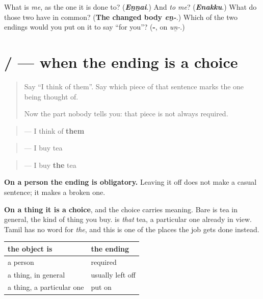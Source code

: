 \begin{tcolorbox}[breakable,colback=teal!4,colframe=teal!35!black,title={Before you move on}]
What is \emph{me}, as the one it is done to? (\emph{\textbf{Eṉṉai}}.) And \emph{to me}? (\emph{\textbf{Enakku}}.) What do those two have in common? (\textbf{The changed body \emph{eṉ-}}.) Which of the two endings would you put on it to say \textquotedblleft{}for you\textquotedblright{}? (\textbf{-}, on \emph{uṉ-}.)
\end{tcolorbox}
\section[\texorpdfstring{\ta{தேநீர்} / \ta{தேநீரை} (tēnīr / tēnīrai)}{தேநீர் / தேநீரை (tēnīr / tēnīrai)}]{ /  — when the ending is a choice}

\label{lesson:TA-C86-rational}



\begin{quote}
Say \textquotedblleft{}I think of them\textquotedblright{}. Say which piece of that sentence marks the one being thought of.

Now the part nobody tells you: that piece is not always required.
\end{quote}

\begin{grammarlens}[title={Grammar Lens: a person must have it, a thing need not}]
\begin{quote}
\textbf{}  — I think of \textbf{them}
\end{quote}

\begin{quote}
\textbf{}  — I buy tea
\end{quote}

\begin{quote}
\textbf{}  — I buy \textbf{the} tea
\end{quote}

\textbf{On a person the ending is obligatory.} Leaving it off does not make a casual sentence; it makes a broken one.

\textbf{On a thing it is a choice}, and the choice carries meaning. Bare \textbf{} is tea in general, the kind of thing you buy. \textbf{} is \emph{that} tea, a particular one already in view. Tamil has no word for \emph{the}, and this is one of the places the job gets done instead.

\noindent
\begin{tabularx}{\linewidth}{@{}>{\raggedright\arraybackslash}X>{\raggedright\arraybackslash}X@{}}
\toprule
\textbf{the object is} & \textbf{the ending} \\
\midrule
a person & required \\
a thing, in general & usually left off \\
a thing, a particular one & put on \\
\bottomrule
\end{tabularx}
\end{grammarlens}

